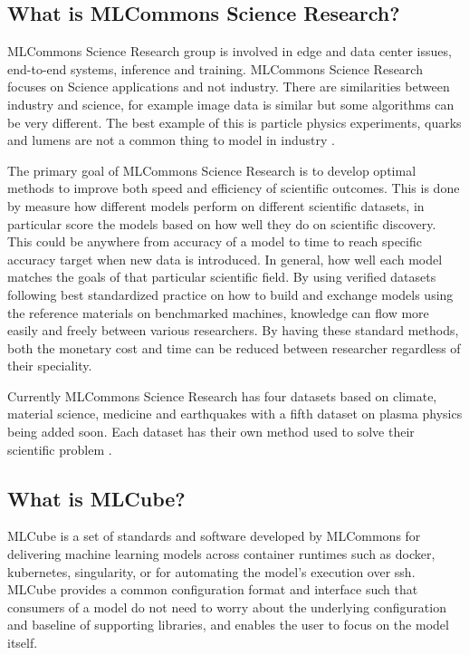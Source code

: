 \documentclass[sigplan,screen]{acmart}
\providecommand{\mlcube}{MLCube}
\begin{document}
\subsection{What is MLCommons Science Research?}

MLCommons Science Research group is involved in edge and data center issues, end-to-end systems, inference and training. MLCommons Science Research focuses on Science applications and not industry. There are similarities between industry and science, for example image data is similar but some algorithms can be very different. The best example of this is particle physics experiments, quarks and lumens are not a common thing to model in industry \cite{www-mlcommons-science}. 

The primary goal of MLCommons Science Research is to develop optimal methods to improve both speed and efficiency of scientific outcomes. This is done by measure how different models perform on different scientific datasets, in particular score the models based on how well they do on scientific discovery. This could be anywhere from accuracy of a model to time to reach  specific accuracy target when new data is introduced. In general, how well each model matches the goals of that particular scientific field. By using verified datasets following best standardized practice on how to build and exchange models using the reference materials on benchmarked machines, knowledge can flow more easily and freely between various researchers. By having these standard methods, both the monetary cost and time can be reduced between researcher regardless of their speciality.

Currently MLCommons Science Research has four datasets based on climate, material science, medicine and earthquakes with a fifth dataset on plasma physics being added soon. Each dataset has their own method used to solve their scientific problem \cite{www-mlcommons-science}.

\subsection{What is \mlcube{}?}

\mlcube{} is  a set of standards and software developed by MLCommons for delivering machine learning models across container runtimes such as docker, kubernetes, singularity, or for automating the model's execution over ssh.
\mlcube{} provides a common configuration format and interface such that consumers of a model do not need to worry about the underlying configuration and baseline of supporting libraries, and enables the user to focus on the model itself\cite{www-mlcube}.
\end{document}
